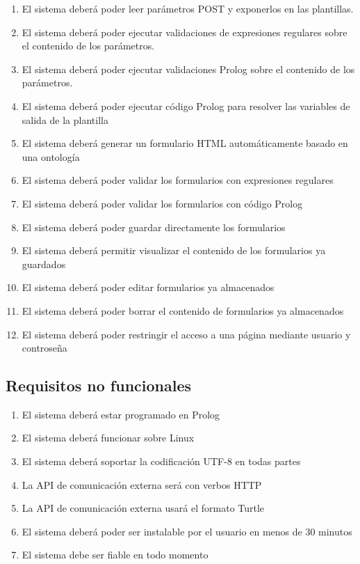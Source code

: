 \documentclass[12pt]{report} %
\begin{document}
\begin{enumerate}
    \item El sistema deberá poder leer parámetros POST y exponerlos en las plantillas.
    \item El sistema deberá poder ejecutar validaciones de expresiones regulares sobre el contenido de los parámetros.
    \item El sistema deberá poder ejecutar validaciones Prolog sobre el contenido de los parámetros. 
    \item El sistema deberá poder ejecutar código Prolog para resolver las variables de salida de la plantilla
    \item El sistema deberá generar un formulario HTML automáticamente basado en una ontología
    \item El sistema deberá poder validar los formularios con expresiones regulares
    \item El sistema deberá poder validar los formularios con código Prolog
    \item El sistema deberá poder guardar directamente los formularios
    \item El sistema deberá permitir visualizar el contenido de los formularios ya guardados
    \item El sistema deberá poder editar formularios ya almacenados
    \item El sistema deberá poder borrar el contenido de formularios ya almacenados
    \item El sistema deberá poder restringir el acceso a una página mediante usuario y controseña
\end{enumerate}

\subsection{Requisitos no funcionales}
\begin{enumerate}
    \item El sistema deberá estar programado en Prolog
    \item El sistema deberá funcionar sobre Linux
    \item El sistema deberá soportar la codificación UTF-8 en todas partes
    \item La API de comunicación externa será con verbos HTTP
    \item La API de comunicación externa usará el formato Turtle
    \item El sistema deberá poder ser instalable por el usuario en menos de 30 minutos
    \item El sistema debe ser fiable en todo momento
\end{enumerate}
\end{document}
